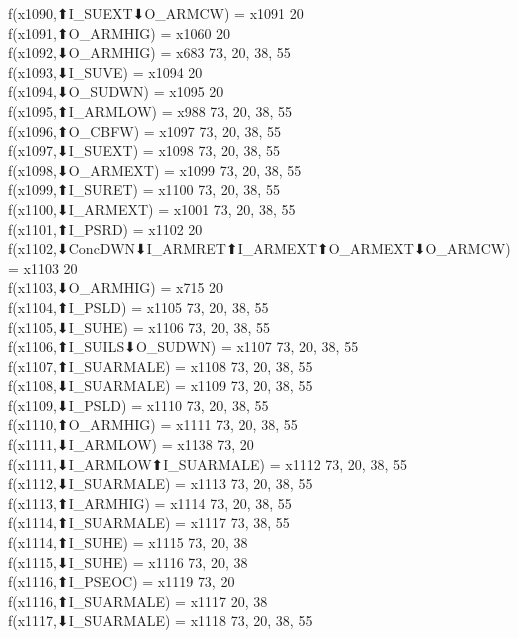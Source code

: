 f(x1090,⬆I_SUEXT⬇O_ARMCW) = x1091 {20} \\
f(x1091,⬆O_ARMHIG) = x1060 {20} \\
f(x1092,⬇O_ARMHIG) = x683 {73, 20, 38, 55} \\
f(x1093,⬇I_SUVE) = x1094 {20} \\
f(x1094,⬇O_SUDWN) = x1095 {20} \\
f(x1095,⬆I_ARMLOW) = x988 {73, 20, 38, 55} \\
f(x1096,⬆O_CBFW) = x1097 {73, 20, 38, 55} \\
f(x1097,⬇I_SUEXT) = x1098 {73, 20, 38, 55} \\
f(x1098,⬇O_ARMEXT) = x1099 {73, 20, 38, 55} \\
f(x1099,⬆I_SURET) = x1100 {73, 20, 38, 55} \\
f(x1100,⬇I_ARMEXT) = x1001 {73, 20, 38, 55} \\
f(x1101,⬆I_PSRD) = x1102 {20} \\
f(x1102,⬇ConcDWN⬇I_ARMRET⬆I_ARMEXT⬆O_ARMEXT⬇O_ARMCW) = x1103 {20} \\
f(x1103,⬇O_ARMHIG) = x715 {20} \\
f(x1104,⬆I_PSLD) = x1105 {73, 20, 38, 55} \\
f(x1105,⬇I_SUHE) = x1106 {73, 20, 38, 55} \\
f(x1106,⬆I_SUILS⬇O_SUDWN) = x1107 {73, 20, 38, 55} \\
f(x1107,⬆I_SUARMALE) = x1108 {73, 20, 38, 55} \\
f(x1108,⬇I_SUARMALE) = x1109 {73, 20, 38, 55} \\
f(x1109,⬇I_PSLD) = x1110 {73, 20, 38, 55} \\
f(x1110,⬆O_ARMHIG) = x1111 {73, 20, 38, 55} \\
f(x1111,⬇I_ARMLOW) = x1138 {73, 20} \\
f(x1111,⬇I_ARMLOW⬆I_SUARMALE) = x1112 {73, 20, 38, 55} \\
f(x1112,⬇I_SUARMALE) = x1113 {73, 20, 38, 55} \\
f(x1113,⬆I_ARMHIG) = x1114 {73, 20, 38, 55} \\
f(x1114,⬆I_SUARMALE) = x1117 {73, 38, 55} \\
f(x1114,⬆I_SUHE) = x1115 {73, 20, 38} \\
f(x1115,⬇I_SUHE) = x1116 {73, 20, 38} \\
f(x1116,⬆I_PSEOC) = x1119 {73, 20} \\
f(x1116,⬆I_SUARMALE) = x1117 {20, 38} \\
f(x1117,⬇I_SUARMALE) = x1118 {73, 20, 38, 55} \\
